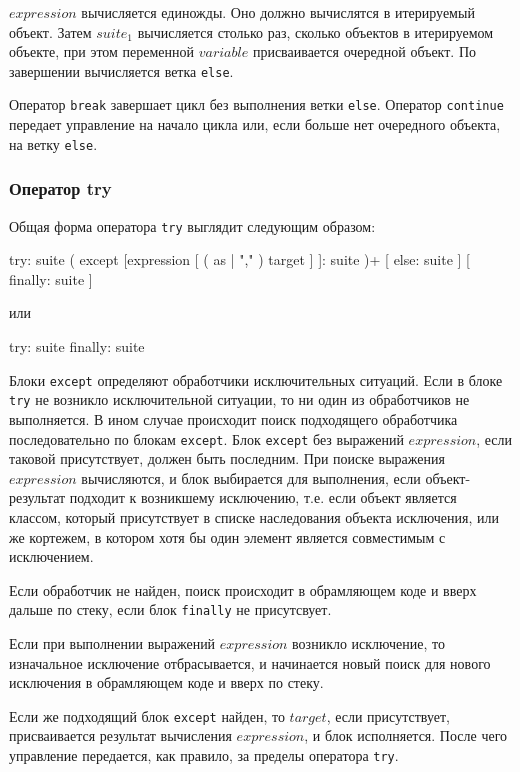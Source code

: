 $expression$ вычисляется единожды. Оно должно вычислятся в итерируемый объект. Затем $suite_1$ вычисляется столько раз, сколько объектов в итерируемом объекте, при этом переменной $variable$ присваивается очередной объект. По завершении вычисляется ветка \lstinline{else}.

Оператор \lstinline{break} завершает цикл без выполнения ветки \lstinline{else}. Оператор \lstinline{continue} передает управление на начало цикла или, если больше нет очередного объекта, на ветку \lstinline{else}.

\subsubsection{Оператор try}
Общая форма оператора \lstinline{try} выглядит следующим образом:
\begin{pylst}{}{}
try: suite
( except [expression [ ( as | "," ) target ] ]: suite )+
[ else: suite ]
[ finally: suite ]
\end{pylst}
или
\begin{pylst}{}{}
try: suite
finally: suite
\end{pylst}

Блоки \lstinline{except} определяют обработчики исключительных ситуаций. Если в блоке \lstinline{try} не возникло исключительной ситуации, то ни один из обработчиков не выполняется. В ином случае происходит поиск подходящего обработчика последовательно по блокам \lstinline{except}. Блок \lstinline{except} без выражений $expression$, если таковой присутствует, должен быть последним. При поиске выражения $expression$ вычисляются, и блок выбирается для выполнения, если объект-результат подходит к возникшему исключению, т.е. если объект является классом, который присутствует в списке наследования объекта исключения, или же кортежем, в котором хотя бы один элемент является совместимым с исключением.

Если обработчик не найден, поиск происходит в обрамляющем коде и вверх дальше по стеку, если блок \lstinline{finally} не присутсвует.

Если при выполнении выражений $expression$ возникло исключение, то изначальное исключение отбрасывается, и начинается новый поиск для нового исключения в обрамляющем коде и вверх по стеку.

Если же подходящий блок \lstinline{except} найден, то $target$, если присутствует, присваивается результат вычисления $expression$, и блок исполняется. После чего управление передается, как правило, за пределы оператора \lstinline{try}.

